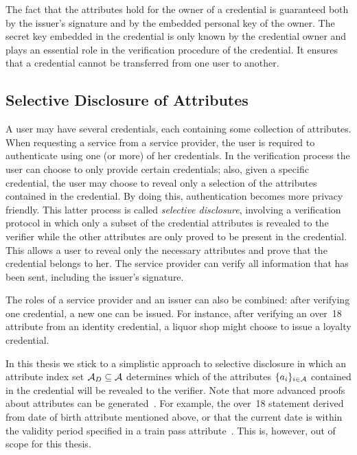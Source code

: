 The fact that the attributes hold for the owner of a credential is guaranteed
both by the issuer's signature and by the embedded personal key of the owner.
The secret key embedded in the credential is only known by the credential owner
and plays an essential role in the verification procedure of the credential. It ensures that a credential cannot be transferred
from one user to another.

\subsection{Selective Disclosure of Attributes}

A user may have several credentials, each containing some collection of
attributes. When requesting a service from a service provider, the user is
required to authenticate using one (or more) of her credentials. In the
verification process the user can choose to only provide certain credentials;
also, given a specific credential, the user may choose to reveal only a
selection of the attributes contained in the credential. By
doing this, authentication becomes more privacy friendly. This latter process is
called \emph{selective disclosure}, involving
a verification protocol in which only a subset of the credential attributes is
revealed to the verifier while the other attributes are only proved to be
present in the credential. This allows a user to reveal only the necessary
attributes and prove that the credential belongs to her. The service provider
can verify all information that has been sent, including the issuer's signature.

The roles of a service provider and an issuer can also be combined: after
verifying one credential, a new one can be issued. For instance, after verifying
an \textsf{over~18} attribute from an identity credential, a liquor shop might
choose to issue a \textsf{loyalty} credential.

In this thesis we stick to a simplistic approach to selective disclosure in
which an attribute index set $\mathcal{A}_D \subseteq \mathcal{A}$ determines which of the
attributes $\{a_i\}_{i \in \mathcal{A}}$ contained in the credential will be revealed to
the verifier. Note that more advanced proofs about attributes can be
generated~\cite{IdemixCrypto2012}. For example, the \textsf{over~18} statement
derived from \textsf{date of birth} attribute mentioned above, or that the
current date is within the validity period specified in a \textsf{train pass}
attribute~\cite{Rogaar2011}. This is, however, out of scope for this thesis.

